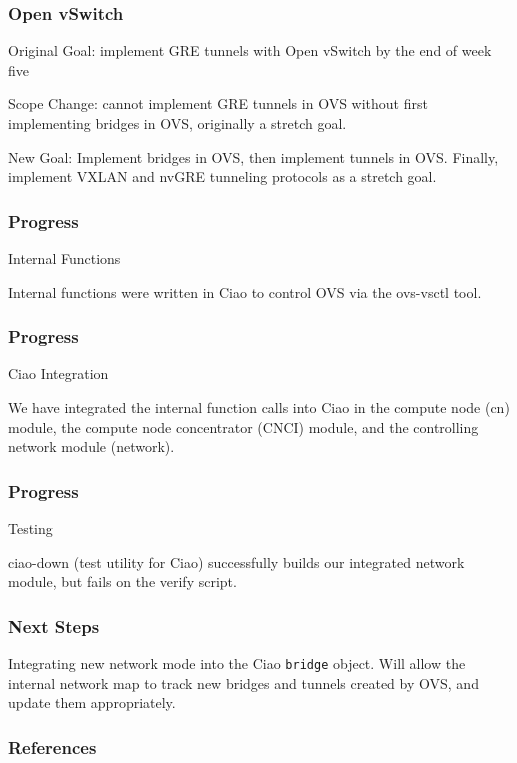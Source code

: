 \documentclass[pdf]{beamer}
\begin{document}
\begin{frame}
	\frametitle{Open vSwitch}
	Original Goal: implement GRE tunnels with Open vSwitch by the end of week five

	Scope Change: cannot implement GRE tunnels in OVS without first
	implementing bridges in OVS, originally a stretch goal.

	New Goal: Implement bridges in OVS, then implement tunnels in OVS.
	Finally, implement VXLAN and nvGRE tunneling protocols as a stretch
	goal.
\end{frame}

\begin{frame}
	\frametitle{Progress}
	Internal Functions

	Internal functions were written in Ciao to control OVS via the ovs-vsctl
	tool.
\end{frame}

\begin{frame}
	\frametitle{Progress}
	Ciao Integration

	We have integrated the internal function calls into Ciao in the compute
	node (cn) module, the compute node concentrator (CNCI) module, and the
	controlling network module (network).
\end{frame}

\begin{frame}
	\frametitle{Progress}
	Testing

	ciao-down (test utility for Ciao) successfully builds our integrated
	network module, but fails on the verify script.
\end{frame}

\begin{frame}
	\frametitle{Next Steps}
	Integrating new network mode into the Ciao \texttt{bridge} object. Will
	allow the internal network map to track new bridges and tunnels created
	by OVS, and update them appropriately.
\end{frame}

\begin{frame}
	\frametitle{References}
	
	
\end{frame}
\end{document}
